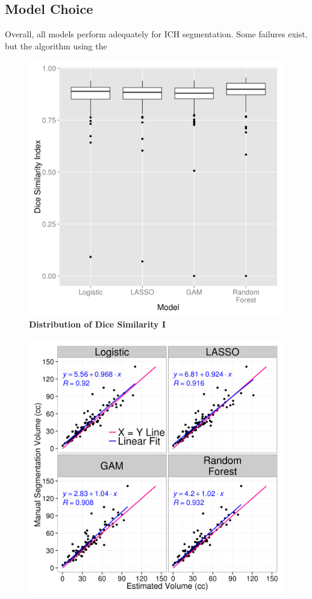 \documentclass{elsarticle_nonatbib}\usepackage[]{graphicx}\usepackage[]{color}
\begin{document}
\subsection{Model Choice}
Overall, all models perform adequately for ICH segmentation.  Some failures exist, but the algorithm using the 





\begin{figure}
\includegraphics[scale=1]{Reseg_Dice_Comparison.png}
\caption{{\bf Distribution of Dice Similarity I} }
\label{fig:dice}
\end{figure}

\begin{figure}
\includegraphics[scale=1]{Reseg_Volume_Comparison.png}
\caption{}
\label{fig:vol}
\end{figure}
\end{document}

